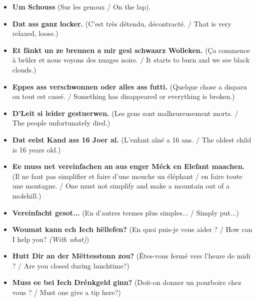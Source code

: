 \begin{itemize}
    \item \textbf{Um Schouss} (Sur les genoux / On the lap).
    \item \textbf{Dat ass ganz locker.} (C'est très détendu, décontracté. / That is very relaxed, loose.)
    \item \textbf{Et fänkt un ze brennen a mir gesi schwaarz Wolleken.} (Ça commence à brûler et nous voyons des nuages noirs. / It starts to burn and we see black clouds.)
    \item \textbf{Eppes ass verschwonnen oder alles ass futti.} (Quelque chose a disparu ou tout est cassé. / Something has disappeared or everything is broken.)
    \item \textbf{D'Leit si leider gestuerwen.} (Les gens sont malheureusement morts. / The people unfortunately died.)
    \item \textbf{Dat eelst Kand ass 16 Joer al.} (L'enfant aîné a 16 ans. / The oldest child is 16 years old.)
    \item \textbf{Ee muss net vereinfachen an aus enger Méck en Elefant maachen.} (Il ne faut pas simplifier et faire d'une mouche un éléphant / en faire toute une montagne. / One must not simplify and make a mountain out of a molehill.)
    \item \textbf{Vereinfacht gesot...} (En d'autres termes plus simples... / Simply put...)
    \item \textbf{Woumat kann ech Iech hëllefen?} (En quoi puis-je vous aider ? / How can I help you? \textit{(With what)})
    \item \textbf{Hutt Dir an der Mëttesstonn zou?} (Êtes-vous fermé vers l'heure de midi ? / Are you closed during lunchtime?)
    \item \textbf{Muss ee bei Iech Drénkgeld ginn?} (Doit-on donner un pourboire chez vous ? / Must one give a tip here?)
\end{itemize}

\vspace{1cm}

